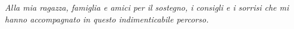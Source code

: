 %
\clearpage
{}
\begin{center}
  \begin{flushright}
    \begin{minipage}{.5\textwidth}
      \textit{Alla mia ragazza, famiglia e amici per il sostegno, i consigli e i
      sorrisi che mi hanno accompagnato in questo indimenticabile percorso.}
    \end{minipage}
  \end{flushright}
\end{center}
\clearpage